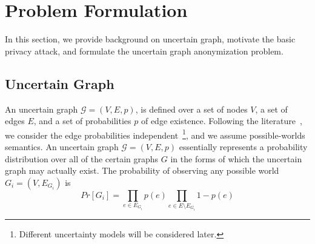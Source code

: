 \section{Problem Formulation}
\label{sec:notation}

In this section, we provide background on uncertain graph, motivate the basic privacy attack, and formulate the uncertain graph anonymization problem. 

\vspace{-2.5pt}
\subsection{Uncertain Graph}
\vspace{-2.5pt}
An uncertain graph $\mathcal{G}=(V,E,\mathit{p})$, is defined over a set of nodes $V$, a set of edges $E$, and a set of probabilities $\mathit{p}$ of edge existence. Following the literature~\cite{Potamias_K_2010,Zhao_Detecting_2014,Colbourn_Colbourn_1987}, we consider the edge probabilities independent~\footnote{Different uncertainty models will be considered later.}, and we assume possible-worlds semantics. An uncertain graph $\mathcal{G}=(V,E,\mathit{p})$ essentially represents a probability distribution over all of the certain graphs $G$ in the forms of which the uncertain graph may actually exist. 
The probability of observing any possible world $G_i=(V,E_{G_i})$ is    
\begin{equation*}
    Pr[G_i]=\prod_{e \in E_{G_i}} {\mathit{p}(e)} \prod_{e \in E \setminus E_{G_i}} 1-\mathit{p}(e)
\end{equation*}




